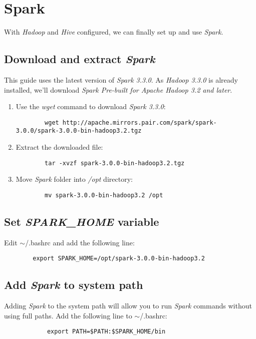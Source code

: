 \documentclass{article}
\begin{document}
\section{Spark}
With \emph{Hadoop} and \emph{Hive} configured, we can finally set up and use \emph{Spark}.

        \subsection{Download and extract \emph{Spark}}
        This guide uses the latest version of \emph{Spark 3.3.0}. As \emph{Hadoop 3.3.0} is
        already installed, we'll download \emph{Spark Pre-built for Apache Hadoop 3.2 and later}.
        \begin{enumerate}
        \item Use the \emph{wget} command to download \emph{Spark 3.3.0}:
        \begin{verbatim}
        wget http://apache.mirrors.pair.com/spark/spark-3.0.0/spark-3.0.0-bin-hadoop3.2.tgz
        \end{verbatim}

        \item Extract the downloaded file:
        \begin{verbatim}
        tar -xvzf spark-3.0.0-bin-hadoop3.2.tgz
        \end{verbatim}

        \item Move \emph{Spark} folder into \emph{/opt} directory:
        \begin{verbatim}
        mv spark-3.0.0-bin-hadoop3.2 /opt
        \end{verbatim}
        \end{enumerate}

        \subsection{Set \emph{SPARK\_HOME} variable}
        Edit $\sim$/.bashrc and add the following line:
        \begin{verbatim}
        export SPARK_HOME=/opt/spark-3.0.0-bin-hadoop3.2
        \end{verbatim}

        \subsection{Add \emph{Spark} to system path}
        Adding \emph{Spark} to the system path will allow you to run \emph{Spark} commands without
        using full paths. Add the following line to $\sim$/.bashrc:
        \begin{verbatim}
            export PATH=$PATH:$SPARK_HOME/bin
        \end{verbatim}
\end{document}
